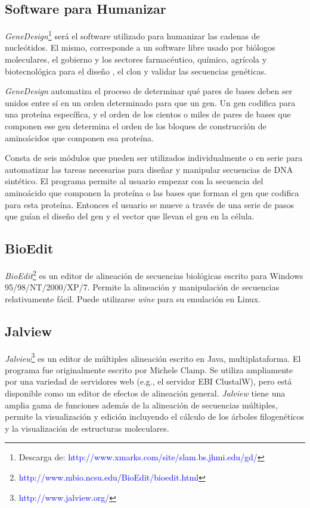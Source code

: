 \documentclass[12pt,a4paper,spanish]{article}
\begin{document}
	\subsection{Software para Humanizar}
		\par \emph{GeneDesign}\footnote{Descarga de: \textcolor{blue}{http://www.xmarks.com/site/slam.bs.jhmi.edu/gd/}}  			\cite{4}\cite{5} será el software utilizado para humanizar las cadenas de nucleótidos. El mismo, corresponde 			a un software libre usado por biólogos moleculares, el gobierno y los sectores farmacéutico, químico, agrícola y 			biotecnológica para el diseño \cite{3}, el clon y validar las secuencias genéticas.

		\par \emph{GeneDesign} automatiza el proceso de determinar qué pares de bases deben ser unidos entre sí en un 			orden determinado para que un gen. Un gen codifica para una proteína específica, y el orden de los cientos o miles 			de pares de bases que componen ese gen determina el orden de los bloques de construcción de aminoácidos que 		componen esa proteína. 

		\par Consta de seis módulos que pueden ser utilizados individualmente o en serie para automatizar las tareas 			necesarias para diseñar y manipular secuencias de DNA sintético. El programa permite al usuario empezar con la 			secuencia del aminoácido que componen la proteína o las bases que forman el gen que codifica para esta proteína. 			Entonces el usuario se mueve a través de una serie de pasos que guían el diseño del gen y el vector que llevan el 			gen en la célula. 

	\subsection{BioEdit}		

		\par \textit{BioEdit}\footnote{\textcolor{blue}{http://www.mbio.ncsu.edu/BioEdit/bioedit.html}} es un editor de 		alineación de secuencias biológicas escrito para Windows 95/98/NT/2000/XP/7. Permite la alineación y manipulación 			de secuencias relativamente fácil. Puede utilizarse \textit{wine} para su emulación en Linux.

	\subsection{Jalview}
		\par \textit{Jalview}\footnote{\textcolor{blue}{http://www.jalview.org/}} es un editor de múltiples alineación 			escrito en Java, multiplataforma. El programa fue originalmente escrito por Michele Clamp. Se utiliza ampliamente 			por una variedad de servidores web (e.g., el servidor EBI ClustalW), pero está disponible como un editor 			de efectos de alineación general. \textit{Jalview} tiene una amplia gama de funciones además de la alineación de 			secuencias múltiples, permite la visualización y edición incluyendo el cálculo de los árboles filogenéticos y la 			visualización de estructuras moleculares. 
\end{document}

